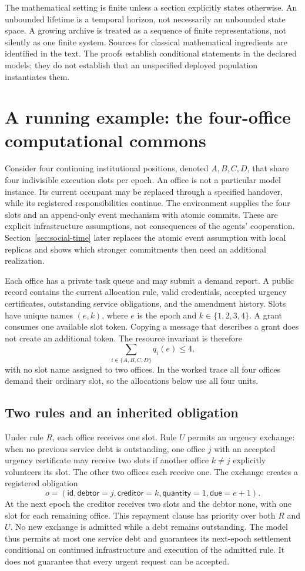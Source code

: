 \documentclass[11pt,letterpaper]{article}
\theoremstyle{plain}
\theoremstyle{definition}
\theoremstyle{remark}
\begin{document}
The mathematical setting is finite unless a section explicitly states otherwise. An unbounded lifetime is a temporal horizon, not necessarily an unbounded state space. A growing archive is treated as a sequence of finite representations, not silently as one finite system. Sources for classical mathematical ingredients are identified in the text. The proofs establish conditional statements in the declared models; they do not establish that an unspecified deployed population instantiates them.


\section{A running example: the four-office computational commons}\label{sec:commons}
Consider four continuing institutional positions, denoted $A,B,C,D$, that share four indivisible execution slots per epoch. An office is not a particular model instance. Its current occupant may be replaced through a specified handover, while its registered responsibilities continue. The environment supplies the four slots and an append-only event mechanism with atomic commits. These are explicit infrastructure assumptions, not consequences of the agents' cooperation. Section~\ref{sec:social-time} later replaces the atomic event assumption with local replicas and shows which stronger commitments then need an additional realization.

Each office has a private task queue and may submit a demand report. A public record contains the current allocation rule, valid credentials, accepted urgency certificates, outstanding service obligations, and the amendment history. Slots have unique names $(e,k)$, where $e$ is the epoch and $k\in\{1,2,3,4\}$. A grant consumes one available slot token. Copying a message that describes a grant does not create an additional token. The resource invariant is therefore
\[
\sum_{i\in\{A,B,C,D\}}q_i(e)\leq4,
\]
with no slot name assigned to two offices. In the worked trace all four offices demand their ordinary slot, so the allocations below use all four units.

\subsection{Two rules and an inherited obligation}
Under rule $R$, each office receives one slot. Rule $U$ permits an urgency exchange: when no previous service debt is outstanding, one office $j$ with an accepted urgency certificate may receive two slots if another office $k\ne j$ explicitly volunteers its slot. The other two offices each receive one. The exchange creates a registered obligation
\[
o=(\mathsf{id},\mathsf{debtor}=j,\mathsf{creditor}=k,
\mathsf{quantity}=1,\mathsf{due}=e+1).
\]
At the next epoch the creditor receives two slots and the debtor none, with one slot for each remaining office. This repayment clause has priority over both $R$ and $U$. No new exchange is admitted while a debt remains outstanding. The model thus permits at most one service debt and guarantees its next-epoch settlement conditional on continued infrastructure and execution of the admitted rule. It does not guarantee that every urgent request can be accepted.
\end{document}

